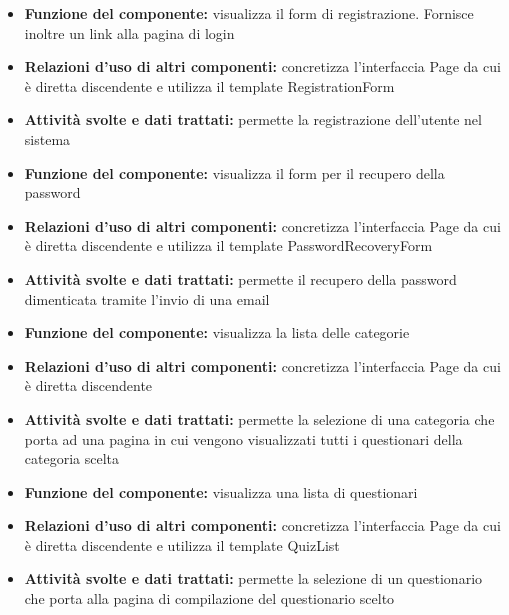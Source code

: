 			\begin{itemize}
		    		\item\textbf{Funzione del componente:} visualizza il form di registrazione. Fornisce inoltre un link alla pagina di login
				\item\textbf{Relazioni d'uso di altri componenti:} concretizza l'interfaccia Page da cui è diretta discendente e utilizza il template RegistrationForm
				\item\textbf{Attività svolte e dati trattati:} permette la registrazione dell'utente nel sistema
			\end{itemize}
			\begin{itemize}
		  		\item\textbf{Funzione del componente:} visualizza il form per il recupero della password
				\item\textbf{Relazioni d'uso di altri componenti:} concretizza l'interfaccia Page da cui è diretta discendente e utilizza il template PasswordRecoveryForm
				\item\textbf{Attività svolte e dati trattati:} permette il recupero della password dimenticata tramite l'invio di una email
			\end{itemize}
			\begin{itemize}
		    		\item\textbf{Funzione del componente:} visualizza la lista delle categorie
				\item\textbf{Relazioni d'uso di altri componenti:} concretizza l'interfaccia Page da cui è diretta discendente
				\item\textbf{Attività svolte e dati trattati:} permette la selezione di una categoria che porta ad una pagina in cui vengono visualizzati tutti i questionari della categoria scelta
			\end{itemize}
			\begin{itemize}
		    		\item\textbf{Funzione del componente:} visualizza una lista di questionari
				\item\textbf{Relazioni d'uso di altri componenti:} concretizza l'interfaccia Page da cui è diretta discendente e utilizza il template QuizList
				\item\textbf{Attività svolte e dati trattati:} permette la selezione di un questionario che porta alla pagina di compilazione del questionario scelto
			\end{itemize}
